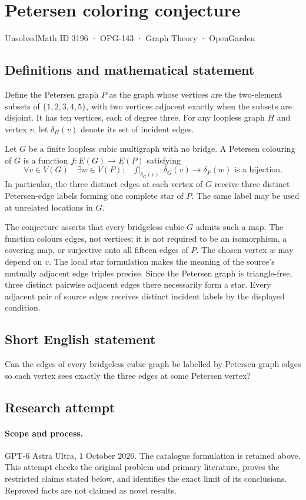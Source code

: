 \documentclass[11pt,a4paper]{article}
\begin{document}
\section*{Petersen coloring conjecture}\label{3196}
{\small UnsolvedMath ID 3196 · OPG-143 · Graph Theory · OpenGarden}
\subsection{Definitions and mathematical statement}
Define the Petersen graph $P$ as the graph whose
vertices are the two-element subsets of
$\{1,2,3,4,5\}$, with two vertices adjacent
exactly when the subsets are disjoint. It has
ten vertices, each of degree three. For any
loopless graph $H$ and vertex $v$, let
$\delta_H(v)$ denote its set of incident edges.

Let $G$ be a finite loopless cubic multigraph
with no bridge. A Petersen colouring of $G$
is a function $f:E(G)\to E(P)$ satisfying
\[
 \forall v\in V(G)\quad\exists w\in V(P):
 \quad f\big|_{\delta_G(v)}:
 \delta_G(v)\longrightarrow\delta_P(w)
 \text{ is a bijection}.
\]
In particular, the three distinct edges at
each vertex of $G$ receive three distinct
Petersen-edge labels forming one complete
star of $P$. The same label may be used at
unrelated locations in $G$.

The conjecture asserts that every bridgeless
cubic $G$ admits such a map. The function
colours edges, not vertices; it is not required
to be an isomorphism, a covering map, or
surjective onto all fifteen edges of $P$.
The chosen vertex $w$ may depend on $v$.
The local star formulation makes the meaning
of the source's mutually adjacent edge triples
precise. Since the Petersen graph is triangle-free,
three distinct pairwise adjacent edges there
necessarily form a star. Every adjacent pair
of source edges receives distinct incident
labels by the displayed condition.
\subsection{Short English statement}
Can the edges of every bridgeless cubic graph be labelled by Petersen-graph edges so each vertex sees exactly the three edges at some Petersen vertex?
\subsection{Research attempt}
\paragraph{Scope and process.}
GPT-6 Astra Ultra, 1 October 2026. The catalogue formulation is retained above. This attempt checks the original problem and primary literature, proves the restricted claims stated below, and identifies the exact limit of its conclusions. Reproved facts are not claimed as novel results.
\end{document}
